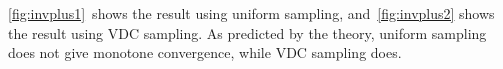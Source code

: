 \cref{fig:invplus1}~shows the result using uniform sampling,
and~\cref{fig:invplus2} shows the result using VDC sampling.
As predicted by the theory, uniform sampling does not give monotone
convergence, while VDC sampling does.
\begin{center}
    \begin{figure}[t]
        \begin{centering}
\end{centering}
\end{figure}
\end{center}
